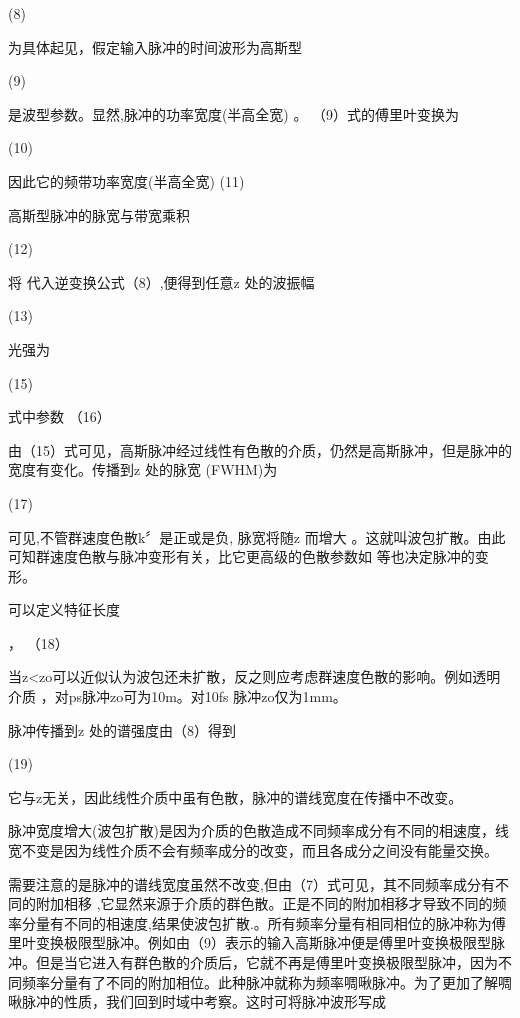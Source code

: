                               (8)

为具体起见，假定输入脉冲的时间波形为高斯型

                                               (9)

 是波型参数。显然,脉冲的功率宽度(半高全宽)    。  （9）式的傅里叶变换为

                                    (10)

因此它的频带功率宽度(半高全宽)                                 (11)

高斯型脉冲的脉宽与带宽乘积

                                              (12)

将 代入逆变换公式（8）,便得到任意z 处的波振幅

                                    (13)

光强为  

                                      (15)

式中参数                        （16）

由（15）式可见，高斯脉冲经过线性有色散的介质，仍然是高斯脉冲，但是脉冲的宽度有变化。传播到z 处的脉宽 (FWHM)为

                                      (17)

可见,不管群速度色散k〞是正或是负, 脉宽将随z 而增大 。这就叫波包扩散。由此可知群速度色散与脉冲变形有关，比它更高级的色散参数如 等也决定脉冲的变形。

可以定义特征长度

        ，                                    （18）        

当z<zo可以近似认为波包还未扩散，反之则应考虑群速度色散的影响。例如透明介质 ，对ps脉冲zo可为10m。对10fs 脉冲zo仅为1mm。

脉冲传播到z 处的谱强度由（8）得到

                                      (19)

它与z无关，因此线性介质中虽有色散，脉冲的谱线宽度在传播中不改变。

脉冲宽度增大(波包扩散)是因为介质的色散造成不同频率成分有不同的相速度，线宽不变是因为线性介质不会有频率成分的改变，而且各成分之间没有能量交换。

需要注意的是脉冲的谱线宽度虽然不改变,但由（7）式可见，其不同频率成分有不同的附加相移 ,它显然来源于介质的群色散。正是不同的附加相移才导致不同的频率分量有不同的相速度,结果使波包扩散.。所有频率分量有相同相位的脉冲称为傅里叶变换极限型脉冲。例如由（9）表示的输入高斯脉冲便是傅里叶变换极限型脉冲。但是当它进入有群色散的介质后，它就不再是傅里叶变换极限型脉冲，因为不同频率分量有了不同的附加相位。此种脉冲就称为频率啁啾脉冲。为了更加了解啁啾脉冲的性质，我们回到时域中考察。这时可将脉冲波形写成
                                          
